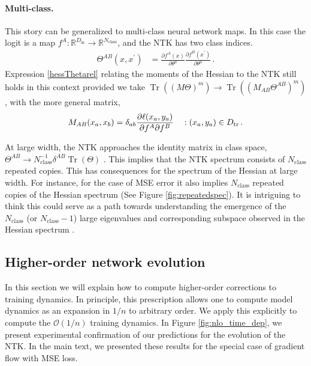 \documentclass[english]{article}
\newcommand{\Din}{\ensuremath{D_{\mathrm{in}}}}
\newcommand{\es}[2] {\begin{align} \label{#1} #2 \end{align}}
\DeclareMathOperator{\trace}{Tr}
\newcommand{\pcite}[1]{\cite{#1}}
\begin{document}
\paragraph{Multi-class.}
This story can be generalized to multi-class neural network maps. In this case the logit is a map $f^{A}:\mathbb{R}^{\Din}\rightarrow \mathbb{R}^{N_\textrm{class}}$, and the NTK has two class indices. 
\es{classyNTK}{
\Theta^{AB}(x,x^{\prime})&=\frac{\partial f^{A}(x)}{\partial\theta^{\mu}}\frac{\partial f^{B}(x^{\prime})}{\partial\theta^{\mu}}\,.
}
Expression \eqref{hessThetarel} relating the moments of the Hessian to the NTK still holds in this context provided we take $\trace\left((M\Theta)^{m}\right)\rightarrow \trace\left((M_{AB}\Theta^{AB})^{m}\right)$, with the more general matrix,
\es{classyMdef}{
M_{AB}(x_{a},x_{b})=\delta_{ab}\frac{\partial\ell(x_a,y_a)}{\partial f^{A}\partial f^{B}} \ \ \ :(x_a,y_a) \in D_{\rm tr}\,.
}

At large width, the NTK approaches the identity matrix in class space, $\Theta^{AB}\rightarrow N_{\textrm{class}}^{-1}\delta^{AB}\trace\left(\Theta\right)$ \pcite{ntk}. This implies that the NTK spectrum consists of $N_{\textrm{class}}$ repeated copies.
This has consequences for the spectrum of the Hessian at large width.
For instance, for the case of MSE error it also implies $N_{\textrm{class}}$ repeated copies of the Hessian spectrum (See Figure \ref{fig:repeatedspec}).
It is intriguing to think this could serve as a path towards understanding the emergence of the $N_{\textrm{class}}$ (or $N_{\textrm{class}}-1$) large eigenvalues and corresponding subspace observed in the Hessian spectrum \pcite{sagun2016eigenvalues, sagun2017empirical, gur2018gradient, ghorbani2019investigation, papyan2019measurements}. 

\subsection{Higher-order network evolution}\label{app:corrections}

In this section we will explain how to compute higher-order corrections to training dynamics.
In principle, this prescription allows one to compute model dynamics as an expansion in $1/n$ to arbitrary order.
We apply this explicitly to compute the $\mathcal{O}(1/n)$ training dynamics. 
In Figure \ref{fig:nlo_time_dep}, we present experimental confirmation of our predictions for the evolution of the NTK.
In the main text, we presented these results for the special case of gradient flow with MSE loss.
\end{document}
